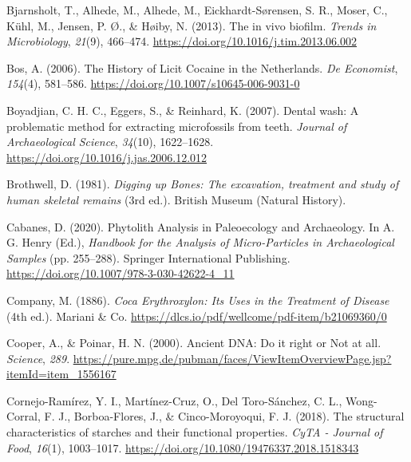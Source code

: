 \documentclass[
  letterpaper,
]{book}
\newlength{\cslhangindent}
\newlength{\cslentryspacingunit} %
\newenvironment{CSLReferences}[2] %
 {%
  \setlength{\parindent}{0pt}
  \ifodd #1
  \let\oldpar\par
  \def\par{\hangindent=\cslhangindent\oldpar}
  \fi
  \setlength{\parskip}{#2\cslentryspacingunit}
 }%
 {}
\begin{document}
\begin{CSLReferences}{1}{0}
\leavevmode{}%
Bjarnsholt, T., Alhede, M., Alhede, M., Eickhardt-Sørensen, S. R.,
Moser, C., Kühl, M., Jensen, P. Ø., \& Høiby, N. (2013). The in vivo
biofilm. \emph{Trends in Microbiology}, \emph{21}(9), 466--474.
\url{https://doi.org/10.1016/j.tim.2013.06.002}

\leavevmode{}%
Bos, A. (2006). The {History} of {Licit Cocaine} in the {Netherlands}.
\emph{De Economist}, \emph{154}(4), 581--586.
\url{https://doi.org/10.1007/s10645-006-9031-0}

\leavevmode{}%
Boyadjian, C. H. C., Eggers, S., \& Reinhard, K. (2007). Dental wash: A
problematic method for extracting microfossils from teeth. \emph{Journal
of Archaeological Science}, \emph{34}(10), 1622--1628.
\url{https://doi.org/10.1016/j.jas.2006.12.012}

\leavevmode{}%
Brothwell, D. (1981). \emph{Digging up {Bones}: {The} excavation,
treatment and study of human skeletal remains} (3rd ed.). {British
Museum (Natural History)}.

\leavevmode{}%
Cabanes, D. (2020). Phytolith {Analysis} in {Paleoecology} and
{Archaeology}. In A. G. Henry (Ed.), \emph{Handbook for the {Analysis}
of {Micro-Particles} in {Archaeological Samples}} (pp. 255--288).
{Springer International Publishing}.
\url{https://doi.org/10.1007/978-3-030-42622-4_11}

\leavevmode{}%
Company, M. (1886). \emph{Coca {Erythroxylon}: {Its Uses} in the
{Treatment} of {Disease}} (4th ed.). {Mariani \& Co.}
\url{https://dlcs.io/pdf/wellcome/pdf-item/b21069360/0}

\leavevmode{}%
Cooper, A., \& Poinar, H. N. (2000). Ancient {DNA}: {Do} it right or
{Not} at all. \emph{Science}, \emph{289}.
\url{https://pure.mpg.de/pubman/faces/ViewItemOverviewPage.jsp?itemId=item_1556167}

\leavevmode{}%
Cornejo-Ramírez, Y. I., Martínez-Cruz, O., Del Toro-Sánchez, C. L.,
Wong-Corral, F. J., Borboa-Flores, J., \& Cinco-Moroyoqui, F. J. (2018).
The structural characteristics of starches and their functional
properties. \emph{CyTA - Journal of Food}, \emph{16}(1), 1003--1017.
\url{https://doi.org/10.1080/19476337.2018.1518343}


\end{CSLReferences}
\end{document}
